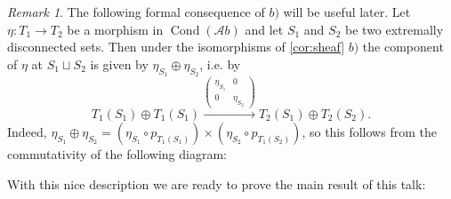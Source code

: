 \documentclass[11pt,A4]{article}
\theoremstyle{plain}
\theoremstyle{definition}
\theoremstyle{remark}
\newtheorem{rem}[thm]{Remark}
\newcommand{\1}{\mathbbm{1}}
\newcommand{\Ab}{\mathscr{A}b}
\DeclareMathOperator{\Cond}{Cond}
\newcommand{\op}{\oplus}
\begin{document}
\begin{rem}\label{rem:sumcomponent}
    The following formal consequence of $b)$ will be useful later.
    Let $\eta\colon T_{1}\to T_{2}$ be a morphism in $\Cond(\Ab)$ and let $S_{1}$ and $S_{2}$ be two extremally disconnected sets.
    Then under the isomorphisms of \cref{cor:sheaf} $b)$ the component of $\eta$ at $S_{1}\sqcup S_{2}$ is given by $\eta_{S_{1}}\op \eta_{S_{2}}$, i.e. by
    \[ T_{1}(S_{1})\op T_{1}(S_{1})\xrightarrow{\begin{pmatrix} \eta_{S_{1}} & 0 \\ 0 & \eta_{S_{2}} \end{pmatrix}} T_{2}(S_{1})\op T_{2}(S_{2}).\]
	Indeed, $\eta_{S_{1}}\op \eta_{S_{2}}=(\eta_{S_{1}}\circ p_{T_{1}(S_{1})})\times (\eta_{S_{2}}\circ p_{T_{1}(S_{2})})$, so this follows from the commutativity of the following diagram:
	\begin{center}
	\end{center}
\end{rem}

With this nice description we are ready to prove the main result of this talk:
\end{document}
